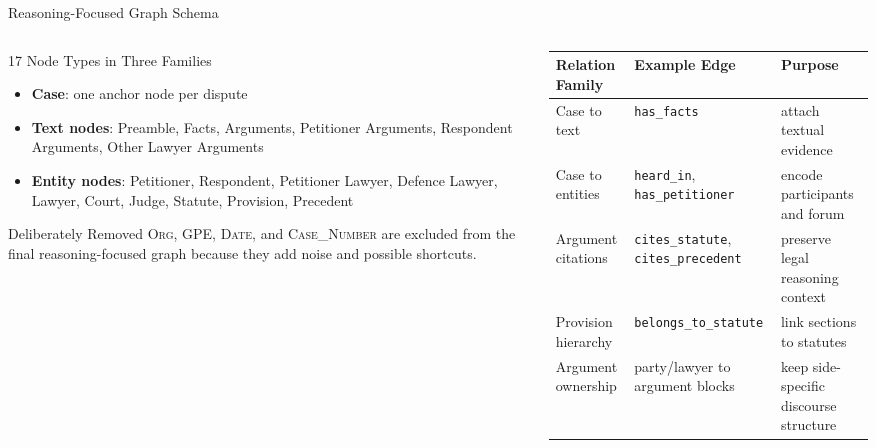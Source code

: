 \documentclass[aspectratio=169,11pt]{beamer}
\newenvironment{tightitemize}{
  \begin{itemize}
    \setlength{\itemsep}{2pt}
    \setlength{\parskip}{0pt}
}{\end{itemize}}
\newcommand{\highlight}[1]{\textcolor{ThesisBlue}{\textbf{#1}}}
\begin{document}
\begin{frame}{Reasoning-Focused Graph Schema}
  \scriptsize
  \begin{columns}[T,onlytextwidth]
    \begin{column}{0.50\textwidth}
      \begin{block}{17 Node Types in Three Families}
        \begin{tightitemize}
          \item \highlight{Case}: one anchor node per dispute
          \item \highlight{Text nodes}: Preamble, Facts, Arguments, Petitioner Arguments, Respondent Arguments, Other Lawyer Arguments
          \item \highlight{Entity nodes}: Petitioner, Respondent, Petitioner Lawyer, Defence Lawyer, Lawyer, Court, Judge, Statute, Provision, Precedent
        \end{tightitemize}
      \end{block}
      \begin{block}{Deliberately Removed}
        \textsc{Org}, \textsc{GPE}, \textsc{Date}, and \textsc{Case\_Number} are excluded from the final reasoning-focused graph because they add noise and possible shortcuts.
      \end{block}
    \end{column}
    \begin{column}{0.44\textwidth}
      \tiny
      \begin{adjustbox}{max width=\linewidth}
        \begin{tabular}{p{2.8cm}p{3.0cm}p{3.2cm}}
          \toprule
          \textbf{Relation Family} & \textbf{Example Edge} & \textbf{Purpose} \\
          \midrule
          Case to text & \texttt{has\_facts} & attach textual evidence \\
          Case to entities & \texttt{heard\_in}, \texttt{has\_petitioner} & encode participants and forum \\
          Argument citations & \texttt{cites\_statute}, \texttt{cites\_precedent} & preserve legal reasoning context \\
          Provision hierarchy & \texttt{belongs\_to\_statute} & link sections to statutes \\
          Argument ownership & party/lawyer to argument blocks & keep side-specific discourse structure \\
          \bottomrule
        \end{tabular}
      \end{adjustbox}
    \end{column}
  \end{columns}
\end{frame}
\end{document}
